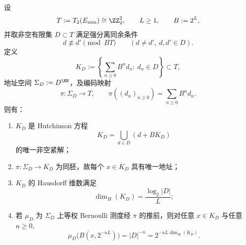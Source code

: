 \begin{theorem}\label{thm:conclusion-godel-leyang-2adic-ifs-exact-dimension}
设
\[
T:=T_2(E_{\min})\cong \ZZ_2^2,\qquad L\ge 1,\qquad B:=2^L,
\]
并取非空有限集 \(D\subset T\) 满足强分离同余条件
\begin{equation}\label{eq:conclusion-godel-leyang-ssc-modBT}
d\not\equiv d'\pmod{BT}\qquad(d\neq d',\ d,d'\in D).
\end{equation}
定义
\begin{equation}\label{eq:conclusion-godel-leyang-kd-def}
K_D:=
\left\{
\sum_{n\ge 0}B^n d_n:\ d_n\in D
\right\}\subset T,
\end{equation}
地址空间 \(\Sigma_D:=D^{\NN}\)，及编码映射
\begin{equation}\label{eq:conclusion-godel-leyang-pi-def}
\pi:\Sigma_D\to T,\qquad
\pi((d_n)_{n\ge 0})=\sum_{n\ge 0}B^n d_n.
\end{equation}
则有：
\begin{enumerate}
  \item \(K_D\) 是 Hutchinson 方程
  \begin{equation}\label{eq:conclusion-godel-leyang-hutchinson}
  K_D=\bigcup_{d\in D}(d+B K_D)
  \end{equation}
  的唯一非空紧解；
  \item \(\pi:\Sigma_D\to K_D\) 为同胚，故每个 \(x\in K_D\) 具有唯一地址；
  \item \(K_D\) 的 Hausdorff 维数满足
  \begin{equation}\label{eq:conclusion-godel-leyang-dimh-exact}
  \dim_H(K_D)=\frac{\log_2|D|}{L};
  \end{equation}
  \item 若 \(\mu_D\) 为 \(\Sigma_D\) 上等权 Bernoulli 测度经 \(\pi\) 的推前，则对任意 \(x\in K_D\) 与任意 \(n\ge 0\),
  \begin{equation}\label{eq:conclusion-godel-leyang-ball-mass-exact}
  \mu_D\!\bigl(B(x,2^{-nL})\bigr)=|D|^{-n}
  =2^{-nL\dim_H(K_D)}.
  \end{equation}
\end{enumerate}
\end{theorem}
